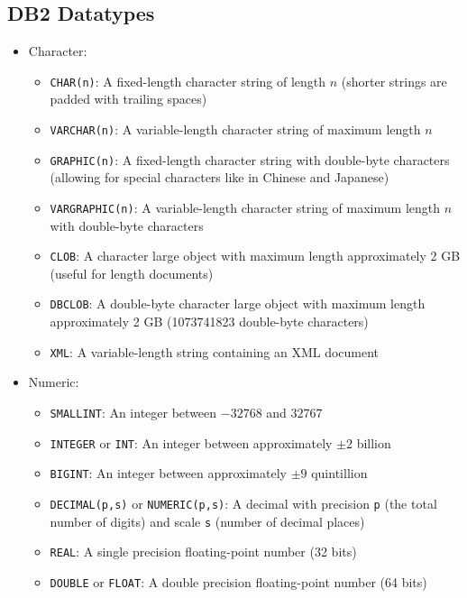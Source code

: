 \documentclass[a4paper]{article}
\begin{document}
\subsection{DB2 Datatypes}
\begin{itemize}
\item Character:
\begin{itemize}
\item \texttt{CHAR(n)}: A fixed-length character string of length $n$ (shorter strings are padded with trailing spaces)
\item \texttt{VARCHAR(n)}: A variable-length character string of maximum length $n$
\item \texttt{GRAPHIC(n)}: A fixed-length character string with double-byte characters (allowing for special characters like in Chinese and Japanese)
\item \texttt{VARGRAPHIC(n)}: A variable-length character string of maximum length $n$ with double-byte characters
\item \texttt{CLOB}: A character large object with maximum length approximately 2 GB (useful for length documents)
\item \texttt{DBCLOB}: A double-byte character large object with maximum length approximately 2 GB (1073741823 double-byte characters)
\item \texttt{XML}: A variable-length string containing an XML document
\end{itemize}
\item Numeric:
\begin{itemize}
\item \texttt{SMALLINT}: An integer between $-32768$ and $32767$
\item \texttt{INTEGER} or \texttt{INT}: An integer between approximately $\pm2$ billion
\item \texttt{BIGINT}: An integer between approximately $\pm 9$ quintillion
\item \texttt{DECIMAL(p,s)} or \texttt{NUMERIC(p,s)}: A decimal with precision \texttt{p} (the total number of digits) and scale \texttt{s} (number of decimal places)
\item \texttt{REAL}: A single precision floating-point number (32 bits)
\item \texttt{DOUBLE} or \texttt{FLOAT}: A double precision floating-point number (64 bits)

\end{itemize}
\end{itemize}
\end{document}
